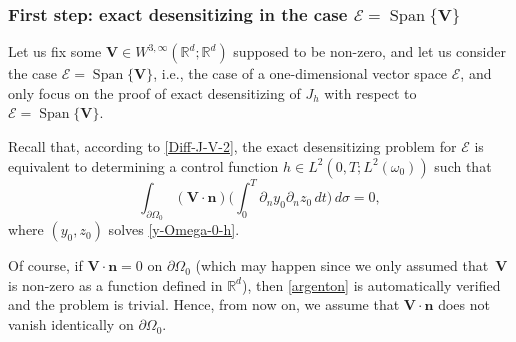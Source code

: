 \documentclass[11pt]{article}
\newcommand{\ie}{i.e.,\xspace}
\numberwithin{equation}{section}
\newcommand{\bn}{\boldsymbol{n}}
\newcommand{\bV}{\boldsymbol{V}}
\DeclareMathOperator{\Span}{Span}
\theoremstyle{definition}
\begin{document}
\subsubsection*{First step: exact desensitizing in the case $\mathcal{E}=\Span \{\bV\}$}
Let us fix some $\bV\in W^{3,\infty}(\mathbb R^d;\mathbb R^d)$ supposed to be non-zero, and let us consider the case $\mathcal{E}=\Span \{\bV\}$, \ie the case of a one-dimensional vector space $\mathcal{E}$, and only focus on the proof of exact desensitizing of $J_h$ with respect to $\mathcal{E} = \Span \{\bV\}$.

Recall that, according to \eqref{Diff-J-V-2}, the exact desensitizing problem for $\mathcal{E}$ is equivalent to determining a control function $h \in L^2(0,T; L^2(\omega_0))$ such that
\begin{equation}
\label{argenton}
\int_{\partial\Omega_{0}}(\bV\cdot \bn)
\biggl(\int_{0}^{T}\partial_{n}y_{0}\partial_{n} z_{0}\, dt \biggr)\,
d\sigma
=0,
\end{equation}
where $(y_0,z_0)$ solves \eqref{y-Omega-0-h}.

Of course, if $\bV\cdot \bn=0$ on $\partial\Omega_0$ (which may happen since we only assumed that~$\bV $ is non-zero as a function defined in $\mathbb R^d$), then \eqref{argenton} is automatically verified and the problem is trivial. Hence, from now on, we assume that $\bV\cdot \bn$ does not vanish {identically} on $\partial\Omega_0$.
\end{document}
